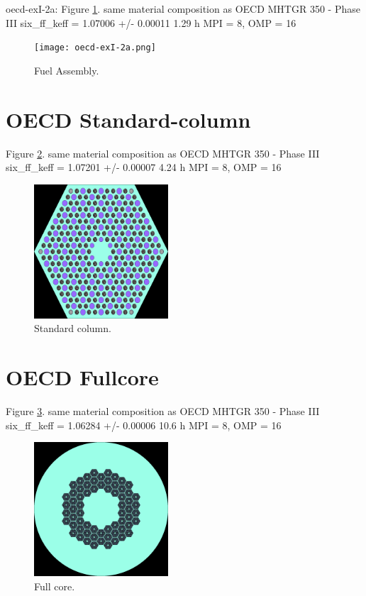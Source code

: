 \documentclass[11pt,letterpaper]{article}
\begin{document}
oecd-exI-2a: Figure \ref{fig:assembly}.
same material composition as OECD MHTGR 350 - Phase III
six_ff_keff = 1.07006 +/- 0.00011
1.29 h MPI = 8, OMP = 16

\begin{figure}[htbp!]
	\centering
	\texttt{[image: oecd-exI-2a.png]}
	\caption{Fuel Assembly.}
	\label{fig:assembly}
\end{figure}

\section{OECD Standard-column}

Figure \ref{fig:stcol}.
same material composition as OECD MHTGR 350 - Phase III
six_ff_keff = 1.07201 +/- 0.00007
4.24 h MPI = 8, OMP = 16

\begin{figure}[htbp!]
	\centering
	\includegraphics[height=5cm]{oecd-standard-column_geom1.png}
	\caption{Standard column.}
	\label{fig:stcol}
\end{figure}

\section{OECD Fullcore}

Figure \ref{fig:fullcore}.
same material composition as OECD MHTGR 350 - Phase III
six_ff_keff = 1.06284 +/- 0.00006
10.6 h MPI = 8, OMP = 16

\begin{figure}[htbp!]
	\centering
	\includegraphics[height=5cm]{oecd-fullcore_geom1.png}
	\caption{Full core.}
	\label{fig:fullcore}
\end{figure}

\pagebreak


\end{document}
